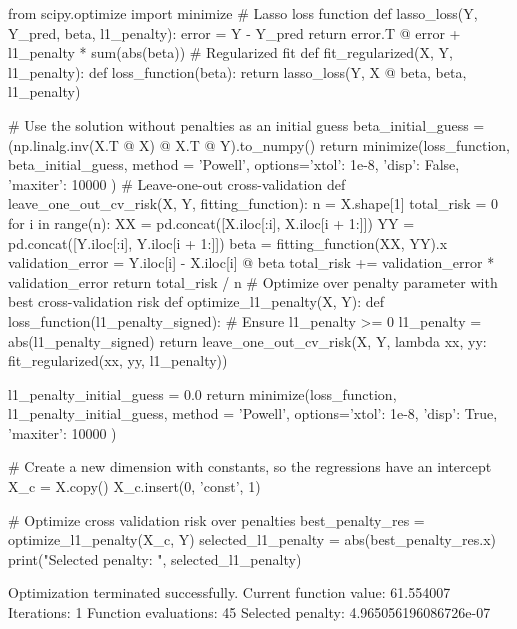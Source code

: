 \begin{python}
from scipy.optimize import minimize
# Lasso loss function
def lasso_loss(Y, Y_pred, beta, l1_penalty):
    error = Y - Y_pred
    return error.T @ error + l1_penalty * sum(abs(beta))
# Regularized fit
def fit_regularized(X, Y, l1_penalty):
    def loss_function(beta):
        return lasso_loss(Y, X @ beta, beta, l1_penalty)
    
    # Use the solution without penalties as an initial guess
    beta_initial_guess = (np.linalg.inv(X.T @ X) @ X.T @ Y).to_numpy()
    return minimize(loss_function, beta_initial_guess, method = 'Powell',
                    options={'xtol': 1e-8, 'disp': False, 'maxiter': 10000 }) 
# Leave-one-out cross-validation
def leave_one_out_cv_risk(X, Y, fitting_function):
    n = X.shape[1]
    total_risk = 0
    for i in range(n):
        XX = pd.concat([X.iloc[:i], X.iloc[i + 1:]])
        YY = pd.concat([Y.iloc[:i], Y.iloc[i + 1:]])
        beta = fitting_function(XX, YY).x
        validation_error = Y.iloc[i] - X.iloc[i] @ beta
        total_risk += validation_error * validation_error
    return total_risk / n
# Optimize over penalty parameter with best cross-validation risk
def optimize_l1_penalty(X, Y):
    def loss_function(l1_penalty_signed):
        # Ensure l1_penalty >= 0
        l1_penalty = abs(l1_penalty_signed)
        return leave_one_out_cv_risk(X, Y, lambda xx, yy: fit_regularized(xx, yy, l1_penalty))
    
    l1_penalty_initial_guess = 0.0
    return minimize(loss_function, l1_penalty_initial_guess, method = 'Powell',
                   options={'xtol': 1e-8, 'disp': True, 'maxiter': 10000 })
\end{python}

\begin{python}
# Create a new dimension with constants, so the regressions have an intercept
X_c = X.copy()
X_c.insert(0, 'const', 1)
\end{python}

\begin{python}
# Optimize cross validation risk over penalties
best_penalty_res = optimize_l1_penalty(X_c, Y)
selected_l1_penalty = abs(best_penalty_res.x)
print("Selected penalty: ", selected_l1_penalty)
\end{python}
\begin{console}
Optimization terminated successfully.
         Current function value: 61.554007
         Iterations: 1
         Function evaluations: 45
Selected penalty:  4.965056196086726e-07
\end{console}

